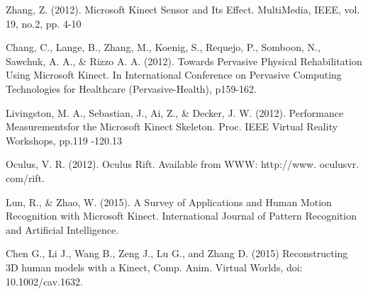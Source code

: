 \begin{thebibliography}{10}
  	Zhang, Z. (2012). Microsoft Kinect Sensor and Its Effect. MultiMedia, IEEE, vol. 19, no.2, pp. 4-10
 	
 	Chang, C., Lange, B., Zhang, M., Koenig, S., Requejo, P., Somboon, N., Sawchuk, A. A., \& Rizzo A. A. (2012). Towards Pervasive Physical Rehabilitation Using Microsoft Kinect. In International Conference on Pervasive Computing Technologies for Healthcare (Pervasive-Health), p159-162.
 	
 	 Livingston, M. A., Sebastian, J., Ai, Z., \& Decker, J. W. (2012). Performance Measurementsfor the Microsoft Kinect Skeleton. Proc. IEEE Virtual Reality Workshops, pp.119 -120.13
  
  	Oculus, V. R. (2012). Oculus Rift. Available from WWW: http://www. oculusvr. com/rift.
  
  	Lun, R., \& Zhao, W. (2015). A Survey of Applications and Human Motion Recognition with Microsoft Kinect. International Journal of Pattern Recognition and Artificial Intelligence.
  	
  	Chen G., Li J., Wang B., Zeng J., Lu G., and Zhang D. (2015) Reconstructing 3D human models with a Kinect, Comp. Anim. Virtual Worlds, doi: 10.1002/cav.1632.
  	
\end{thebibliography}

